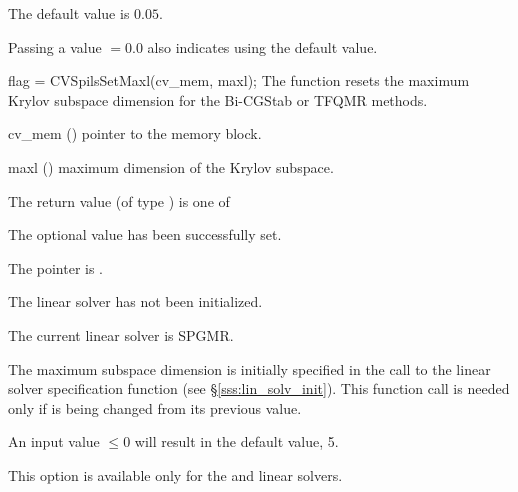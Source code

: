 {
  The default value is $0.05$.

  Passing a value $ = 0.0$ also indicates using the default value.
}
{
  flag = CVSpilsSetMaxl(cv\_mem, maxl);
}
{
  The function  resets the maximum Krylov subspace
  dimension for the Bi-CGStab or TFQMR 
  methods.
}
{
  \begin{args}[cv\_mem]
  \item[cv\_mem] ()
    pointer to the {\cvode} memory block.
  \item[maxl] ()
    maximum dimension of the Krylov subspace.
  \end{args}
}
{
  The return value  (of type ) is one of
  \begin{args}
  \item[\Id{CVSPILS\_SUCCESS}] 
    The optional value has been successfully set.
  \item[\Id{CVSPILS\_MEM\_NULL}]
    The  pointer is .
  \item[\Id{CVSPILS\_LMEM\_NULL}]
    The {\cvspils} linear solver has not been initialized.
  \item[\Id{CVSPILS\_ILL\_INPUT}]
    The current linear solver is SPGMR.  
  \end{args}
}
{
  The maximum subspace dimension is initially specified in the call
  to the linear solver specification function (see \S\ref{sss:lin_solv_init}). 
  This function call is needed only if  is being changed from its 
  previous value.

  An input value  $\leq 0$ will result in the default value, 5.

  {\warn}This option is available only for the {\cvspbcg} and {\cvsptfqmr} linear solvers.
}


